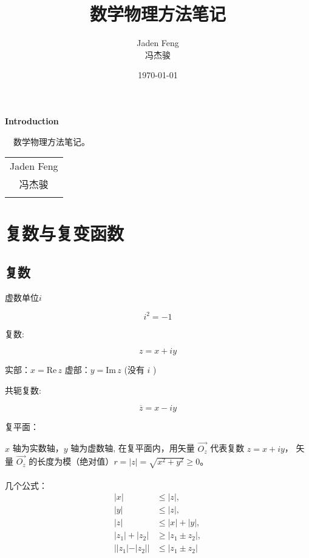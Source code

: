 \documentclass[cn,hazy,blue,14pt,normal]{elegantnote}
\title{数学物理方法笔记}
\author{Jaden Feng\\冯杰骏}
\date{}
\numberwithin{equation}{section}
\begin{document}
\maketitle
{}
\setcounter{page}{1}
\newpage
\begin{center}
    \Huge\textbf{{Introduction}}\\
\end{center}~\
数学物理方法笔记。
\begin{flushright}
    \begin{tabular}{c}
        Jaden Feng\\
        冯杰骏\\
        \date{\today}
    \end{tabular}
\end{flushright}

\newpage
{}
\setcounter{page}{1}
\tableofcontents

\newpage
\setcounter{page}{1}

\section{复数与复变函数}
\newpage
\subsection{复数}
\begin{definition}
  虚数单位$i$
\end{definition}
$$i^2=-1 $$

\begin{definition}
  复数:
\end{definition}
$$z=x+iy$$ 
\begin{center}
	实部：$x=\text{Re}\,z$ \qquad 虚部：$y=\text{Im}\,z$ (没有 $i$ )
\end{center}

\begin{definition}
	  共轭复数:
\end{definition}
$$\overline{z} =x-iy$$
\begin{definition}
	复平面：
\end{definition}
$x$ 轴为实数轴，$y$ 轴为虚数轴,
在复平面内，用矢量 $\vec{O_z}$ 代表复数 $z=x+iy$​ ，
矢量 $\vec{O_z}$ 的长度为模（绝对值）$r=|z|=\sqrt{x^2+y^2} \geqslant 0 $。\\
\\
几个公式：
\begin{equation}\label{Complex_fundamental_inequality}
	\begin{aligned}
		|x| &\leqslant |z|, \\
		|y| &\leqslant |z|, \\
		|z| &\leqslant |x|+|y|, \\
		|z_1|+|z_2| &\geqslant |z_1 \pm z_2|, \\
		||z_1|-|z_2|| &\leqslant |z_1 \pm z_2| 
	\end{aligned}
\end{equation}
\end{document}
